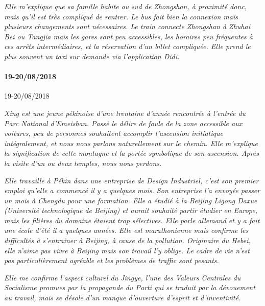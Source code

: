 \textit{Elle m'explique que sa famille habite au sud de Zhongshan, à proximité donc, mais qu'il est très compliqué de rentrer. Le bus fait bien la connexion mais plusieurs changements sont nécessaires. Le train connecte Zhongshan à Zhuhai Bei ou Tangjia mais les gares sont peu accessibles, les horaires peu fréquentes à ces arrêts intermédiaires, et la réservation d'un billet compliquée. Elle prend le plus souvent un taxi sur demande via l'application Didi.}



\paragraph{19-20/08/2018}{19-20/08/2018}

\textit{Xing est une jeune pékinoise d'une trentaine d'année rencontrée à l'entrée du Parc National d'Emeishan. Passé le délire de foule de la zone accessible aux voitures, peu de personnes souhaitent accomplir l'ascension initiatique intégralement, et nous nous parlons naturellement sur le chemin. Elle m'explique la signification de cette montagne et la portée symbolique de son ascension. Après la visite d'un ou deux temples, nous nous perdons.}

\textit{Elle travaille à Pékin dans une entreprise de Design Industriel, c'est son premier emploi qu'elle a commencé il y a quelques mois. Son entreprise l'a envoyée passer un mois à Chengdu pour une formation. Elle a étudié à la Beijing Ligong Daxue (Université technologique de Beijing) et aurait souhaité partir étudier en Europe, mais les filières du domaine étaient trop sélectives. Elle parle allemand et y a fait une école d'été il a quelques années. Elle est marathonienne mais confirme les difficultés à s'entrainer à Beijing, à cause de la pollution. Originaire du Hebei, elle n'aime pas vivre à Beijing mais son travail l'y oblige. Le cadre de vie n'est pas particulièrement agréable et les problèmes de traffic sont pesants.}

\textit{Elle me confirme l'aspect culturel du \emph{Jingye}, l'une des Valeurs Centrales du Socialisme promues par la propagande du Parti qui se traduit par la dévouement au travail, mais se désole d'un manque d'ouverture d'esprit et d'inventivité.}






\stars











